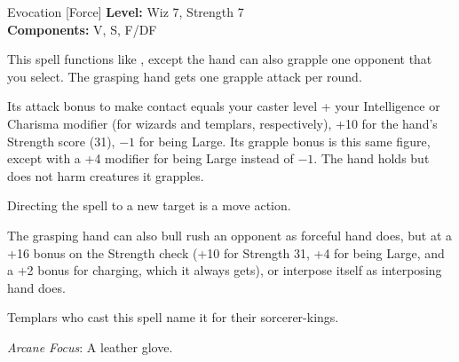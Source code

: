 {Evocation [Force]}
{
	\textbf{Level:}
	Wiz 7, Strength 7\\
	\textbf{Components:}
	V, S, F/DF\\
}
{
	This spell functions like , except the hand can also grapple one opponent that you select. The grasping hand gets one grapple attack per round.

	Its attack bonus to make contact equals your caster level + your Intelligence or Charisma modifier (for wizards and templars, respectively), +10 for the hand's Strength score (31), $-1$ for being Large. Its grapple bonus is this same figure, except with a +4 modifier for being Large instead of $-1$. The hand holds but does not harm creatures it grapples.

	Directing the spell to a new target is a move action.

	The grasping hand can also bull rush an opponent as forceful hand does, but at a +16 bonus on the Strength check (+10 for Strength 31, +4 for being Large, and a +2 bonus for charging, which it always gets), or interpose itself as interposing hand does.

	Templars who cast this spell name it for their sorcerer-kings.

	\textit{Arcane Focus}:
	A leather glove.

}
